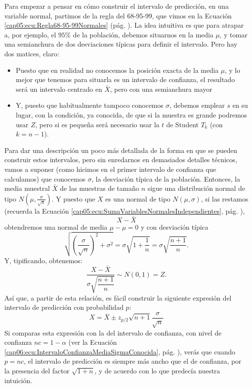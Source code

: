 Para empezar a pensar en cómo construir el intervalo de predicción, en una variable normal, partimos de la regla del 68-95-99, que vimos en la Ecuación \ref{cap05:ecu:Regla68-95-99Normales} (pág. \pageref{cap05:ecu:Regla68-95-99Normales}). La idea intuitiva es que para atrapar a, por ejemplo, el $95\%$ de la población, debemos situarnos en la media $\mu$, y tomar una semianchura de dos desviaciones típicas para definir el intervalo. Pero hay dos matices, claro:
\begin{itemize}
  \item Puesto que en realidad no conocemos la posición exacta de la media $\mu$, y lo mejor que tenemos para situarla es un intervalo de confianza, el resultado será un intervalo centrado en $\bar X$, pero con una semianchura mayor
  \item Y, puesto que habitualmente tampoco conocemos $\sigma$, debemos emplear $s$ en su lugar, con la condición, ya conocida, de que si la muestra es grande podremos usar $Z$, pero si es pequeña será necesario usar la $t$ de Student $T_k$ (con $k=n-1$).
\end{itemize}
Para dar una descripción un poco más detallada de la forma en que se pueden construir estos intervalos, pero sin enredarnos en demasiados detalles técnicos, vamos a suponer (como hicimos en el primer intervalo de confianza que calculamos) que conocemos $\sigma$, la desviación típica de la población. Entonces, la media muestral $\bar X$ de las muestras de tamaño $n$ sigue una distribución normal de tipo $N\left(\mu,\frac{\sigma}{\sqrt{n}}\right)$. Y puesto que $X$ es una normal de tipo $N(\mu,\sigma)$, si las restamos (recuerda la Ecuación \ref{cap05:ecu:SumaVariablesNormalesIndependientes}, pág. \pageref{cap05:ecu:SumaVariablesNormalesIndependientes}),
\[X - \bar X\]
obtendremos una normal de media $\mu - \mu =0$ y con desviación típica
\[\sqrt{\left(\dfrac{\sigma}{\sqrt{n}}\right)^2+\sigma^2}=\sigma\sqrt{1+\dfrac{1}{n}}=
\sigma\sqrt{\dfrac{n+1}{n}}.\]
Y, tipificando, obtenemos:
\[
\dfrac{X - \bar X}{\sigma\sqrt{\dfrac{n+1}{n}}}\sim N(0,1)=Z.
\]
Así que, a partir de esta relación, es fácil construir la siguiente expresión del intervalo de predicción con probabilidad $p$:
\begin{equation}
\label{cap06:ecu:IntervaloPrediccionSigmaConocida}
    X = \bar X \pm z_{p/2}\sqrt{n+1}\dfrac{\sigma}{\sqrt{n}}
\end{equation}
Si comparas esta expresión con la del intervalo de confianza, con nivel de confianza $nc=1-\alpha$ (ver la Ecuación \ref{cap06:ecu:IntervaloConfianzaMediaSigmaConocida}, pág. \pageref{cap06:ecu:IntervaloConfianzaMediaSigmaConocida}), verás que cuando $p=nc$, el intervalo de predicción es siempre más ancho que el de confianza, por la presencia del factor $\sqrt{1+n}$, y de acuerdo con lo que predecía nuestra intuición.


